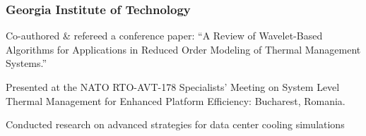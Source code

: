 %
%
\subsubsection{Georgia Institute of Technology}
%
\begin{position}
  \begin{myitem}
  \item Co-authored \& refereed a conference paper: ``A Review of Wavelet-Based Algorithms for
    Applications in Reduced Order Modeling of Thermal Management Systems.''
  \item Presented at the NATO RTO-AVT-178 Specialists' Meeting on System Level Thermal Management for
    Enhanced Platform Efficiency: Bucharest, Romania.
  \item Conducted research on advanced strategies for data center cooling simulations
  \end{myitem}
\end{position}
